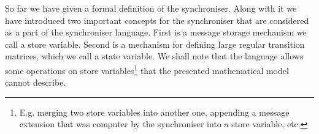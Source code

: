 \begin{enumerate}
%
%
%
  \end{enumerate}

So far we have given a formal definition of the synchroniser. Along with it we have introduced two important concepts for the synchroniser that are considered as a part of the synchroniser language. First is a message storage mechanism we call a store variable. Second is a mechanism for defining large regular transition matrices, which we call a state variable. We shall note that the language allows some operations on store variables\footnote{E.g. merging two store variables into another one, appending a message extension that was computer by the synchroniser into a store variable, etc.} that the presented mathematical model cannot describe.



